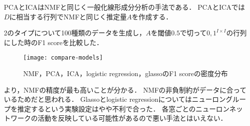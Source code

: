 PCAとICAはNMFと同じく一般化線形成分分析の手法\cite{Cichocki2009}である．
PCAとICAでは$D$に相当する行列でNMFと同じく推定量$A$を作成する．

2のタイプについて100種類のデータを生成し，$A$を閾値$0.5$で切って${0,1}^{I \times I}$の行列にした時のF1 scoreを比較した．
\begin{figure}[htbp]
    \begin{center}
        \texttt{[image: compare-models]}
        \caption{NMF，PCA，ICA，logistic regression，glassoのF1 scoreの密度分布}
        \label{fig:compare-models}
    \end{center}
\end{figure}
より，NMFの精度が最も高いことが分かる．
NMFの非負制約がデータに合っているためだと思われる．
Glassoとlogistic regressionについてはニューロングループを推定するという実験設定はやや不利で合った．
各窓ごとのニューロンネットワークの活動を反映している可能性があるので悪い手法とはいえない．

